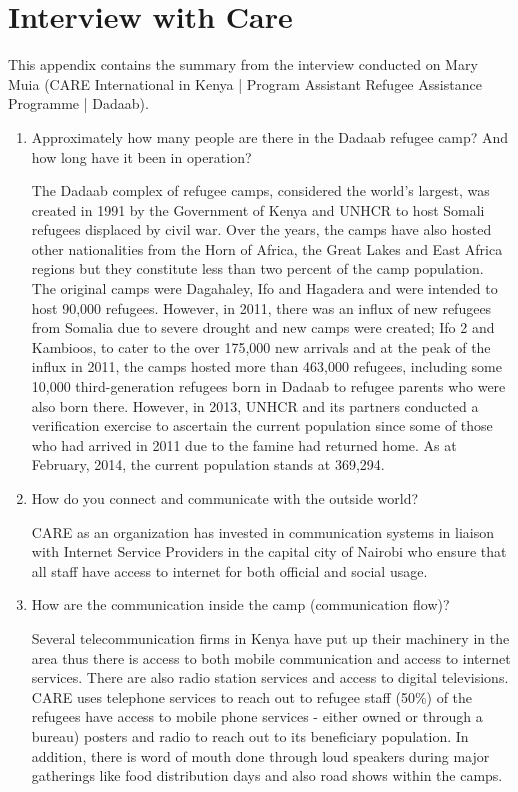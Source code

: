 \chapter{Interview with Care}
\label{chp:appendixA} 

This appendix contains the summary from the interview conducted on Mary Muia (CARE International in Kenya | Program Assistant
Refugee Assistance Programme | Dadaab).


\begin{enumerate}

\item Approximately how many people are there in the Dadaab refugee camp? And how long have it been in operation?

The Dadaab complex of refugee camps, considered the world’s largest, was created in 1991 by the Government of Kenya and UNHCR to host Somali refugees displaced by civil war. Over the years, the camps have also hosted other nationalities from the Horn of Africa, the Great Lakes and East Africa regions but they constitute less than two percent of the camp population. The original camps were Dagahaley, Ifo and Hagadera and were intended to host 90,000 refugees. However, in 2011, there was an influx of new refugees from Somalia due to severe drought and new camps were created; Ifo 2 and Kambioos, to cater to the over 175,000 new arrivals and at the peak of the influx in 2011, the camps hosted more than 463,000 refugees, including some 10,000 third-generation refugees born in Dadaab to refugee parents who were also born there. However, in 2013, UNHCR and its partners conducted a verification exercise to ascertain the current population since some of those who had arrived in 2011 due to the famine had returned home. As at February, 2014, the current population stands at 369,294.

\item How do you connect and communicate with the outside world?

CARE as an organization has invested in communication systems in liaison with Internet Service Providers in the capital city of Nairobi who ensure that all staff have access to internet for both official and social usage.

\item How are the communication inside the camp (communication flow)?

Several telecommunication firms in Kenya have put up their machinery in the area thus there is access to both mobile communication and access to internet services. There are also radio station services and access to digital televisions. CARE uses telephone services to reach out to refugee staff (50\%) of the refugees have access to mobile phone services - either owned or through a bureau) posters and radio to reach out to its beneficiary population. In addition, there is word of mouth done through loud speakers during major gatherings like food distribution days and also road shows within the camps.



\end{enumerate}
